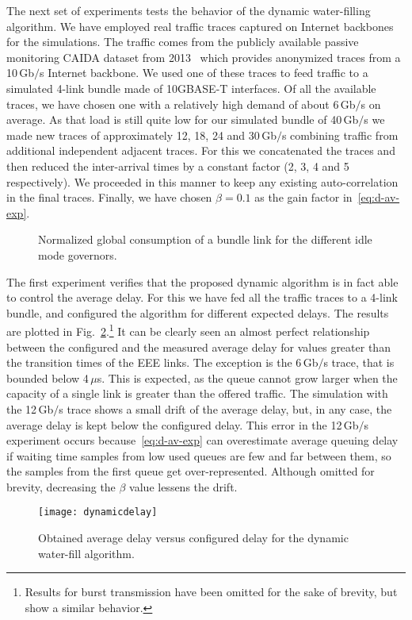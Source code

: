\documentclass[journal,english,twocolumn,10pt,letterpaper]{IEEEtran}
\newcommand{\added}[1]{{#1}}
\begin{document}
The next set of experiments tests the behavior of the dynamic water-filling
algorithm. We have employed real traffic traces captured on Internet backbones
for the simulations. The traffic comes from the publicly available passive
monitoring CAIDA dataset from
2013~\cite{internet13:_caida_ucsd_anony_inter_traces} which provides
anonymized traces from a 10$\,$Gb$/$s Internet backbone. We used one of these
traces to feed traffic to a simulated 4-link bundle made of 10GBASE-T
interfaces. Of all the available traces, we have chosen one with a relatively
high demand of about 6$\,$Gb$/$s on average. As that load is \added{still}
quite low for our simulated bundle of 40$\,$Gb$/$s we made new traces of
approximately 12, 18, 24 and 30$\,$Gb$/$s combining traffic from additional
independent adjacent traces\added{. For this we concatenated the traces and
  then reduced the inter-arrival times by a constant factor (2, 3, 4 and 5
  respectively). We proceeded in this manner to keep any existing
  auto-correlation in the final traces.} \added{Finally, we have chosen
  $\beta=0.1$ as the gain factor in~\eqref{eq:d-av-exp}.}
\begin{figure}
  \centering
  \caption{\label{fig:limits-exp} Normalized global consumption of a bundle
    link for the different idle mode governors.}
\end{figure}


The first experiment verifies that the \added{proposed dynamic }algorithm is
in fact able to control the average delay. For this we have fed all the
traffic traces to a 4-link bundle, and configured the algorithm for different
expected delays. The results are plotted in
\added{Fig.}~\ref{fig:delayvsdelay}.\footnote{Results for burst transmission
  have been omitted for the sake of brevity, but show a similar behavior.} It
can be clearly seen an almost perfect relationship between the configured and
the measured average delay for values greater than the transition times of the
EEE links. The exception is the 6$\,$Gb$/$s trace, that is bounded below
4$\,\mu$s. This is expected, as the queue cannot grow larger when the capacity
of a single link is greater than the offered traffic. The simulation with the
12$\,$Gb$/$s trace shows a small drift of the average delay, but, in any case,
the average delay is kept below the configured delay. \added{This error in the
  12$\,$Gb$/$s experiment occurs because~\eqref{eq:d-av-exp} can overestimate
  average queuing delay if waiting time samples from low used queues are few
  and far between them, so the samples from the first queue get
  over-represented. Although omitted for brevity, decreasing the $\beta$ value
  lessens the drift.}
\begin{figure}
  \centering
  \texttt{[image: dynamicdelay]}
  \caption{Obtained average delay versus configured delay for the dynamic water-fill algorithm.}
  \label{fig:delayvsdelay}
\end{figure}
\end{document}
